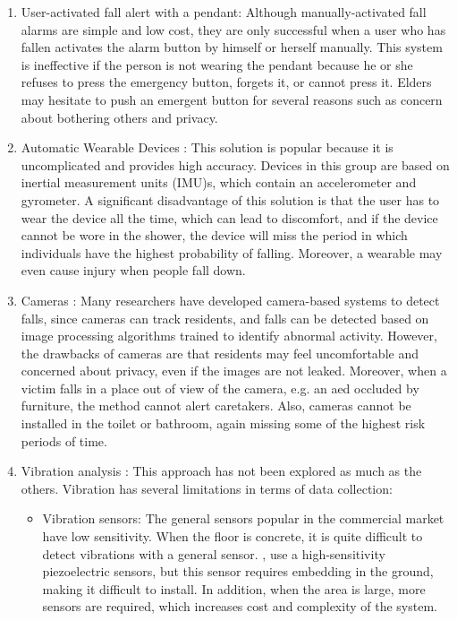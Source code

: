 \begin{enumerate}
\item User-activated fall alert with a pendant: Although manually-activated fall alarms are simple and low cost, they are only successful when a user who has fallen activates the alarm button by himself or herself manually. This system is ineffective if the person is not wearing the pendant because he or she refuses to press the emergency button, forgets it, or cannot press it. Elders may hesitate to push an emergent button for several reasons such as concern about bothering others and privacy.
\item Automatic Wearable Devices \cite{degen_jaeckel_rufer_wyss_2003, yang_hsu_2010, rihana_mondalak_2016}: This solution is popular because it is uncomplicated and provides high accuracy. Devices in this group are based on inertial measurement units (IMU)s, which contain an accelerometer and gyrometer. A significant disadvantage of this solution is that the user has to wear the device all the time, which can lead to discomfort, and if the device cannot be wore in the shower, the device will miss the period in which individuals have the highest probability of falling. Moreover, a wearable may even cause injury when people fall down.
\item Cameras \cite{tsai_hsu_2019, ramirez_velastin_meza_fabregas_makris_farias_2021,taufeeque_koita_spicher_deserno_2021}: Many researchers have developed camera-based systems to detect falls, since cameras can track residents, and falls can be detected based on image processing algorithms trained to identify abnormal activity. However, the drawbacks of cameras are that residents may feel uncomfortable and concerned about privacy, even if the images are not leaked. Moreover, when a victim falls in a place out of view of the camera, e.g. an aed occluded by furniture, the method cannot alert caretakers. Also, cameras cannot be installed in the toilet or bathroom, again missing some of the highest risk periods of time.
\item Vibration analysis
\cite{alwan_rajendran_kell_mack_dalal_wolfe_felder_2006,liu_jiang_su_benzoni_maxwell_2019,clemente_li_valero_song_2020}: This approach has not been  explored as much as the others. Vibration has several limitations in terms of data collection:
\begin{itemize}
\item Vibration sensors: The general sensors popular in the commercial market have low sensitivity. When the floor is concrete, it is quite difficult to detect vibrations with a general sensor.  \citeauthor{madarshahian_caicedo_arocha_zambrana_2016}, \citeyear{madarshahian_caicedo_arocha_zambrana_2016} use a high-sensitivity piezoelectric sensors, but this sensor requires embedding in the ground, making it difficult to install.  In addition, when the area is large, more sensors are required, which increases cost and complexity of the system.

\end{itemize}
\end{enumerate}
